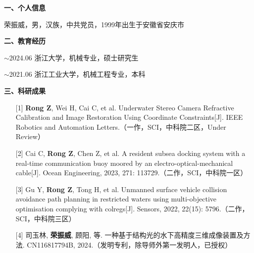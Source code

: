 



\cleardoublepage
{}

{\noindent \textbf{一、个人信息}}

\noindent 荣振威，男，汉族，中共党员，1999年出生于安徽省安庆市

\vspace{0.6cm}
{\noindent \textbf{二、教育经历}}

$ \sim $2024.06 浙江大学，机械专业，硕士研究生

$ \sim $2021.06 浙江工业大学，机械工程专业，本科

\vspace{0.6cm}
{\noindent \textbf{三、科研成果}}

\begin{enumerate}[leftmargin=0.75cm, itemsep=0cm]
\item [{[1]}]
\textbf{Rong Z}, Wei H, Cai C, et al. Underwater Stereo Camera Refractive Calibration and Image Restoration Using Coordinate Constraints[J]. IEEE Robotics and Automation Letters.（一作，SCI，中科院二区，Under Review）
\item [{[2]}]
Cai C, \textbf{Rong Z}, Chen Z, et al. A resident subsea docking system with a real-time communication buoy moored by an electro-optical-mechanical cable[J]. Ocean Engineering, 2023, 271: 113729.（二作，SCI，中科院一区）
\item [{[3]}]
Gu Y, \textbf{Rong Z}, Tong H, et al. Unmanned surface vehicle collision avoidance path planning in restricted waters using multi-objective optimisation complying with colregs[J]. Sensors, 2022, 22(15): 5796.（二作，SCI，中科院三区）
\item [{[4]}]
司玉林, \textbf{荣振威}, 顾阳, 等. 一种基于结构光的水下高精度三维成像装置及方法. CN116817794B, 2024.（发明专利，除导师外第一发明人，已授权）
\end{enumerate}

